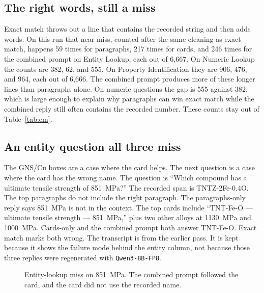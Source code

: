\documentclass[conference]{IEEEtran}
\begin{document}
\subsection{The right words, still a miss}
Exact match throws out a line that contains the recorded string and then adds words. On this run that near miss, counted after the same cleaning as exact match, happens 59 times for paragraphs, 217 times for cards, and 246 times for the combined prompt on Entity Lookup, each out of 6{,}667. On Numeric Lookup the counts are 382, 62, and 555. On Property Identification they are 906, 476, and 964, each out of 6{,}666. The combined prompt produces more of these longer lines than paragraphs alone. On numeric questions the gap is 555 against 382, which is large enough to explain why paragraphs can win exact match while the combined reply still often contains the recorded number. These counts stay out of Table~\ref{tab:em}.

\subsection{An entity question all three miss}
The GNS/Cu boxes are a case where the card helps. The next question is a case where the card has the wrong name. The question is ``Which compound has a ultimate tensile strength of 851~MPa?'' The recorded span is TNTZ-2Fe-0.4O. The top paragraphs do not include the right paragraph. The paragraphs-only reply says 851~MPa is not in the context. The top cards include ``TNT-Fe-O --- ultimate tensile strength --- 851~MPa,'' plus two other alloys at 1130~MPa and 1000~MPa. Cards-only and the combined prompt both answer TNT-Fe-O. Exact match marks both wrong. The transcript is from the earlier pass. It is kept because it shows the failure mode behind the entity column, not because those three replies were regenerated with \texttt{Qwen3-8B-FP8}.

\begin{figure}[H]
\centering
{}
\caption{Entity-lookup miss on 851~MPa. The combined prompt followed the card, and the card did not use the recorded name.}
\label{fig:entity-miss}
\end{figure}
\end{document}
